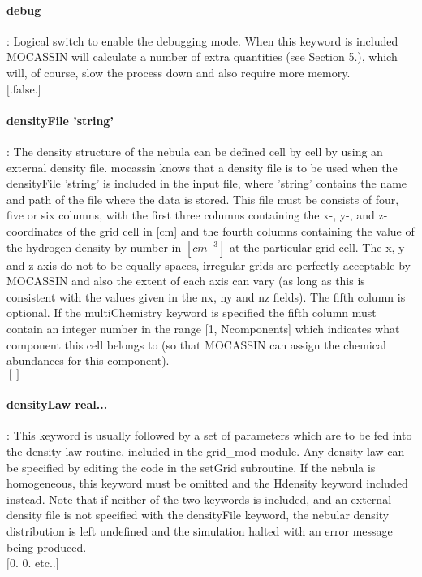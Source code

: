 \documentclass[11pt]{article}
\begin{document}
\paragraph   {debug}             : Logical switch to enable the debugging mode. When this 
		     keyword is included MOCASSIN will calculate a number of 
		     extra quantities (see Section 5.), which will, of course,
		     slow the process down and also require more memory. \\
		     $[$.false.$]$\\

\paragraph   {densityFile 'string'}: The density structure of the nebula can be defined cell by 
	             cell by using an external density file. {\sc mocassin} knows that a 
		     density file is to be used when the densityFile 'string' is 
		     included in the input file, where 'string' contains the name 
		     and path of the file where the data is stored. This file must 
		     be consists of four, five or six columns, with the first three 
		     columns containing the x-, y-, and z- coordinates of the grid cell in 
		     [cm] and the fourth columns containing the value of the hydrogen 
		     density by number in $[cm^{-3}]$ at the particular grid cell. The 
		     x, y and z axis do not to be equally spaces, irregular grids are 
		     perfectly acceptable by MOCASSIN and also the extent of each axis 
		     can vary (as long as this is consistent with the values given in 
		     the nx, ny and nz fields). The fifth column is optional. If the 
                     multiChemistry keyword is specified the fifth column must contain
                     an integer number in the range [1, Ncomponents] which indicates what 
                     component this cell belongs to (so that MOCASSIN can assign the chemical 
                     abundances for this component).\\
		     $[]$\\

\paragraph    {densityLaw real... }: This keyword is usually followed by a set of 
		     parameters which are to be fed into the density law routine, 
		     included in the grid\_mod module. Any density law can be 
		     specified by editing the code in the setGrid subroutine. 
		     If the nebula is homogeneous, this keyword must be omitted 
		     and the Hdensity keyword included instead. Note that if neither
		     of the two keywords is included, and an external density file 
		     is not specified with the densityFile keyword, the nebular 
		     density distribution is left undefined and the simulation 
		     halted with an error message being produced.\\
		     $[$0. 0. etc..$]$\\
    
\end{document}
